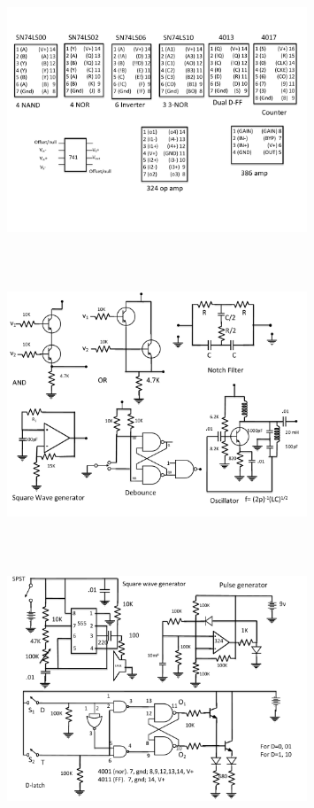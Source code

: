 \begin{figure} 
\center
\includegraphics[width=0.8\textwidth,natwidth=642,natheight=610, height=80mm, width=88mm]{circuit6.pdf}
\end{figure}
\begin{figure} 
\center
\includegraphics[width=0.8\textwidth,natwidth=642,natheight=610, height=80mm, width=88mm]{circuit7.pdf}
\end{figure}
\begin{figure} 
\center
\includegraphics[width=0.8\textwidth,natwidth=642,natheight=610, height=80mm, width=88mm]{circuit8.pdf}
\end{figure}
